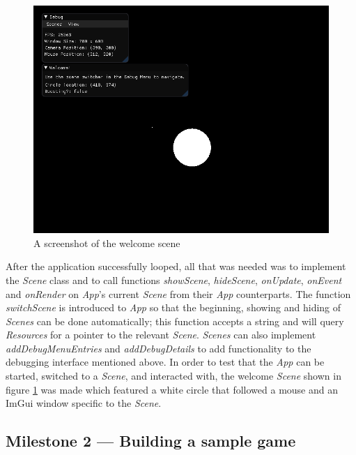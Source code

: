 \documentclass[11pt, a4paper]{report}
\begin{document}
\begin{figure}[!h]
  \centering
  \includegraphics[width=\linewidth]{img/welcome_scene.png}
  \caption{A screenshot of the welcome scene}
  \label{fig:welcomeScene}
\end{figure}

After the application successfully looped, all that was needed was to implement the \emph{Scene} class and to call functions \emph{showScene}, \emph{hideScene}, \emph{onUpdate}, \emph{onEvent} and \emph{onRender} on \emph{App}'s current \emph{Scene} from their \emph{App} counterparts. The function \emph{switchScene} is introduced to \emph{App} so that the beginning, showing and hiding of \emph{Scenes} can be done automatically; this function accepts a string and will query \emph{Resources} for a pointer to the relevant \emph{Scene}. \emph{Scenes} can also implement \emph{addDebugMenuEntries} and \emph{addDebugDetails} to add functionality to the debugging interface mentioned above. In order to test that the \emph{App} can be started, switched to a \emph{Scene}, and interacted with, the welcome \emph{Scene} shown in figure \ref{fig:welcomeScene} was made which featured a white circle that followed a mouse and an ImGui window specific to the \emph{Scene}.

\subsection[Building a sample game]{Milestone 2 --- Building a sample game}
\label{subsec:buildingASampleGame}
\end{document}
